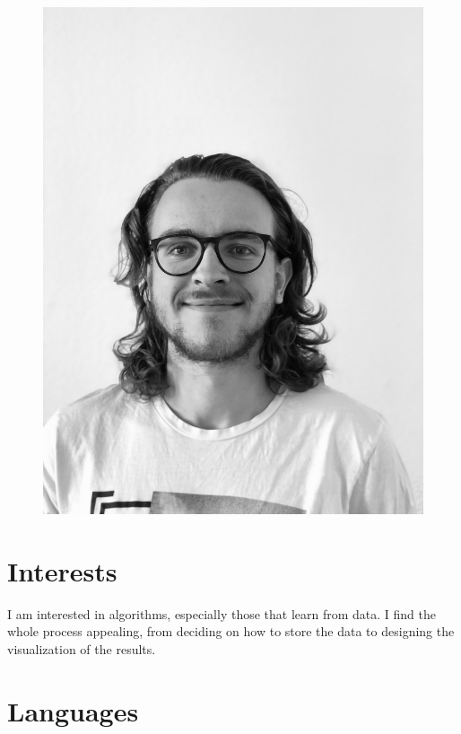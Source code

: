 \documentclass[]{commands}
\begin{document}
\begin{aside}
    ~

\vspace{-3.5cm}
\begin{figure}[ht]
	\hspace{0.3cm}
	\includegraphics[width=.71\linewidth]{img/portrait.jpg}
\end{figure}

\vspace{3.5mm}
\section{Interests}
\vspace{3.5mm}

I am interested in algorithms, especially those that learn from data. I find the whole process appealing, from deciding on how to store the data to designing the visualization of the results.


\vspace{3.5mm}
\section{Languages}
\vspace{3.5mm}


\end{aside}
\end{document}
